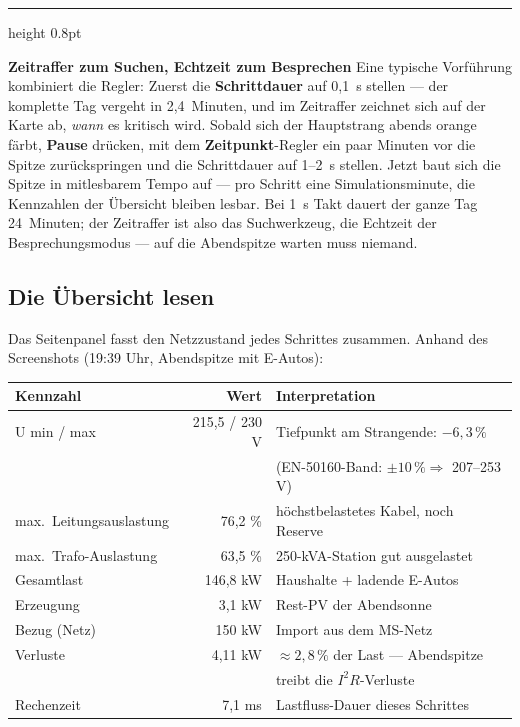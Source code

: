 \documentclass[11pt,a4paper,parskip=half]{scrreprt}
\newcommand{\ui}[1]{\textsf{\bfseries #1}}          %
\newenvironment{beispiel}[1][Beispiel]
  {\par\medskip
   {\color{bsp}\hrule height 0.8pt}\nopagebreak\smallskip
   \noindent\textbf{\textsf{\textcolor{bsp}{#1}}}\quad\ignorespaces}
  {\par\nopagebreak\smallskip{\color{bsp}\hrule height 0.8pt}\par\medskip}
\begin{document}
\begin{beispiel}[Zeitraffer zum Suchen, Echtzeit zum Besprechen]
Eine typische Vorführung kombiniert die Regler: Zuerst die
\ui{Schrittdauer} auf 0{,}1~s stellen --- der komplette Tag vergeht
in 2{,}4~Minuten, und im Zeitraffer zeichnet sich auf der Karte ab,
\emph{wann} es kritisch wird. Sobald sich der Hauptstrang abends
orange färbt, \ui{Pause} drücken, mit dem \ui{Zeitpunkt}-Regler ein
paar Minuten vor die Spitze zurückspringen und die Schrittdauer auf
1--2~s stellen. Jetzt baut sich die Spitze in mitlesbarem Tempo auf
--- pro Schritt eine Simulationsminute, die Kennzahlen der Übersicht
bleiben lesbar. Bei 1~s Takt dauert der ganze Tag 24~Minuten; der
Zeitraffer ist also das Suchwerkzeug, die Echtzeit der
Besprechungsmodus --- auf die Abendspitze warten muss niemand.
\end{beispiel}

\subsection{Die Übersicht lesen}

Das Seitenpanel fasst den Netzzustand jedes Schrittes zusammen.
Anhand des Screenshots (19:39 Uhr, Abendspitze mit E-Autos):

\begin{center}
\small
\begin{tabular}{@{}lrl@{}}
\toprule
Kennzahl & Wert & Interpretation \\
\midrule
U min / max & 215{,}5 / 230 V & Tiefpunkt am Strangende: $-6{,}3\,\%$ \\
 & & (EN-50160-Band: $\pm 10\,\% \Rightarrow$ 207--253 V) \\
max.\ Leitungsauslastung & 76{,}2 \% & höchstbelastetes Kabel, noch Reserve \\
max.\ Trafo-Auslastung & 63{,}5 \% & 250-kVA-Station gut ausgelastet \\
Gesamtlast & 146{,}8 kW & Haushalte + ladende E-Autos \\
Erzeugung & 3{,}1 kW & Rest-PV der Abendsonne \\
Bezug (Netz) & 150 kW & Import aus dem MS-Netz \\
Verluste & 4{,}11 kW & $\approx 2{,}8\,\%$ der Last --- Abendspitze \\
 & & treibt die $I^2R$-Verluste \\
Rechenzeit & 7{,}1 ms & Lastfluss-Dauer dieses Schrittes \\
\bottomrule
\end{tabular}
\end{center}
\end{document}
